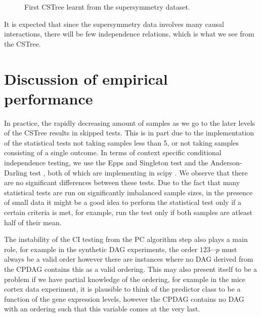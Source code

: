 \documentclass{tufte-book}
\begin{document}
\begin{figure}[!h]\label{fig:susy1}
   \begin{floatrow}
%
\caption{First CSTree learnt from the supersymmetry dataset.}
        
   \end{floatrow}
\end{figure}

It is expected that since the supersymmetry data involves many causal interactions, there will be few independence relations, which is what we see from the CSTree.


\section{Discussion of empirical performance}
\label{sec:orgac81ff7}

In practice, the rapidly decreasing amount of samples as we go to the later levels of the CSTree results in skipped tests. This is in part due to the implementation of the statistical tests not taking samples less than 5, or not taking samples consisting of a single outcome. In terms of context specific conditional independence testing, we use the Epps and Singleton test \cite{epps-1986-omnib-test} and the Anderson-Darling test \cite{scholz-1987-k-sampl}, both of which are implementing in scipy \cite{virtanen-2020-scipy}. We observe that there are no significant differences between these tests. Due to the fact that many statistical tests are run on significantly imbalanced sample sizes, in the presence of small data it might be a good idea to perform the statistical test only if a certain criteria is met, for example, run the test only if both samples are atleast half of their mean. 


The instability of the CI testing from the PC algorithm step also plays a main role, for example in the synthetic DAG experiments, the order \(123\cdots p\) must always be a valid order however there are instances where no DAG derived from the CPDAG contains this as a valid ordering. This may also present itself to be a problem if we have partial knowledge of the ordering, for example in the mice cortex data experiment, it is plausible to think of the predictor class to be a function of the gene expression levels, however the CPDAG contains no DAG with an ordering such that this variable comes at the very last.
\end{document}
